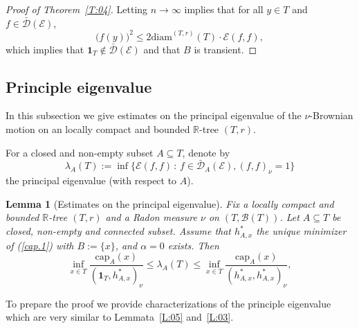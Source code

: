 \documentclass[11pt]{amsart}
\numberwithin{equation}{section}
\newtheorem{lemma}[definition]{Lemma}
\begin{document}
{\begin{proof}[Proof of Theorem~\ref{T:04}]
Letting $n\to\infty$ implies that for all $y\in T$ and $f \in \bar{{\mathcal D}}({\mathcal E})$,
\begin{equation}
\label{e:003}
   \big(f(y)\big)^2\le 2\mathrm{diam}^{(T,r)}(T) \cdot{\mathcal E}(f,f),
\end{equation}
which implies that $\mathbf{1}_T\not \in\bar{\mathcal D}({\mathcal E})$ and that $B$ is transient.
\end{proof}{\smallskip}

\subsection{Principle eigenvalue}
\label{Sub:eigen}
In this subsection we
give estimates on the principal
eigenvalue of the $\nu$-Brownian motion on an locally compact and bounded ${{\mathbb R}}$-tree $(T,r)$.

For a closed and non-empty subset $A\subseteq T$,
denote by
\begin{equation}\label{specvar}
   \lambda_A(T)
 :=
   \inf\big\{\mathcal E(f,f)\,:\,f\in\bar{\mathcal D}_A(\mathcal E),(f,f)_{\nu}=1\big\}
\end{equation}
the {{\it} principal eigenvalue} (with respect to $A$).

\begin{lemma}[Estimates on the principal eigenvalue]
Fix a locally compact and bounded ${{\mathbb R}}$-tree $(T,r)$ and a Radon measure $\nu$  on $(T,{\mathcal B}(T))$.
\label{L:11}
Let $A\subseteq T$  be  closed, non-empty and connected subset. Assume that  $h^\ast_{A,x}$  the unique minimizer of (\ref{cap.1}) with $B:=\{x\}$, and $\alpha=0$ exists. Then
\begin{equation}\label{e:11.0}
   \inf_{x\in T}\frac{\mathrm{cap}_{A}(x)}{(\mathbf 1_T,h^\ast_{A,x})_{\nu}}
 \leq
   \lambda_A(T)
 \leq
   \inf_{x\in T}\frac{\mathrm{cap}_{A}(x)}{(h^\ast_{A,x},h^\ast_{A,x})_{\nu}},
\end{equation}
\end{lemma}{\smallskip}

To prepare the proof we provide characterizations of the principle eigenvalue which are
very similar to Lemmata~\ref{L:05} and~\ref{L:03}.

}
\end{document}
